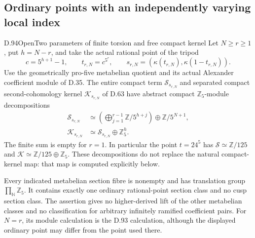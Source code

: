 \subsection{Ordinary points with an independently varying local index}

\begin{statement}{D.94}{Open}{Two parameters of finite torsion and free compact kernel}
Let \(N\ge r\ge1\), put \(h=N-r\), and take the actual
rational point of the tripod
\[
 c=5^{h+1}-1,\qquad t_{r,N}=c^{5^r},\qquad
 s_{r,N}=(\kappa(t_{r,N}),\kappa(1-t_{r,N})).
                                                        \tag{D.94.1}
\]
Use the geometrically pro-five metabelian quotient and its actual
Alexander coefficient module of D.35. The entire compact term
\(\mathcal S_{s_{r,N}}\) and separated compact second-cohomology
kernel \(\mathcal K_{s_{r,N}}\) of D.63 have abstract compact
\(\mathbb Z_5\)-module decompositions
\[
 \begin{aligned}
 \mathcal S_{s_{r,N}}
   &\simeq\left(\bigoplus_{j=1}^{r-1}
                     \mathbb Z/5^{h+j}\right)
                       \oplus\mathbb Z/5^{N+1},\\
 \mathcal K_{s_{r,N}}
   &\simeq\mathcal S_{s_{r,N}}\oplus\mathbb Z_5^h.
 \end{aligned}                                         \tag{D.94.2}
\]
The finite sum is empty for \(r=1\). In particular the point
\(t=24^5\) has \(\mathcal S\simeq\mathbb Z/125\) and
\(\mathcal K\simeq\mathbb Z/125\oplus\mathbb Z_5\).
These decompositions do not replace the natural compact-kernel
map: that map is computed explicitly below.

Every indicated metabelian section fibre is nonempty and has
translation group \(\prod_{\mathbb N}\mathbb Z_5\). It contains
exactly one ordinary rational-point section class and no cusp
section class. The assertion gives no higher-derived lift of the
other metabelian classes and no classification for arbitrary
infinitely ramified coefficient pairs. For \(N=r\), its module
calculation is the D.93 calculation, although the displayed
ordinary point may differ from the point used there.
\end{statement}

